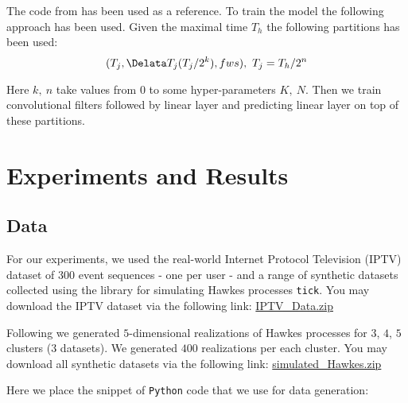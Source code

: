 \documentclass[10pt]{article}
\begin{document}
The code from \cite{asano2020self} has been used as a reference. To train the model the following approach has been used. Given the maximal time $T_h$ the following partitions has been used:
\begin{equation}
    (T_j, \Delata T_j(T_j/2^k), fws),~ T_j = T_h/2^n
\end{equation}

Here $k, ~ n$ take values from $0$ to some hyper-parameters $K, ~N$. Then we train convolutional filters followed by linear layer and predicting linear layer on top of these partitions.

\section{Experiments and Results}\label{sec:exp_res}
\subsection{Data}
For our experiments, we used the real-world Internet Protocol Television (IPTV)  dataset of $300$ event sequences - one per user - and a range of synthetic datasets collected using the library for simulating Hawkes processes \texttt{tick}.
You may download the IPTV dataset via the following link: \href{https://github.com/rodrigorivera/mds20_cohortney/raw/main/data/IPTV_Data.zip}{IPTV\_Data.zip}

Following \cite{123dirichlet} we generated $5$-dimensional realizations of Hawkes processes for $3$, $4$, $5$ clusters ($3$ datasets). We generated $400$ realizations per each cluster. You may download all synthetic  datasets via the following link: \href{https://github.com/rodrigorivera/mds20_cohortney/raw/main/data/simulated_Hawkes.zip}{simulated\_Hawkes.zip}

Here we place the snippet of \texttt{Python} code that we use for data generation:


\end{document}
